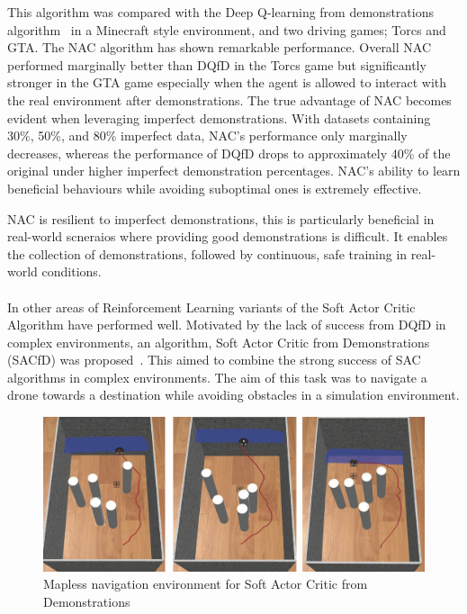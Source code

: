 This algorithm was compared with the Deep Q-learning from demonstrations algorithm~\cite{deepQLearningFromDemo} in a Minecraft style environment, and two driving games; Torcs and GTA.
The NAC algorithm has shown remarkable performance.
Overall NAC performed marginally better than DQfD in the Torcs game but significantly stronger in the GTA game especially when the agent is allowed to interact with the real environment after demonstrations.
The true advantage of NAC becomes evident when leveraging imperfect demonstrations.
With datasets containing 30\%, 50\%, and 80\% imperfect data, NAC's performance only marginally decreases, whereas the performance of DQfD drops to approximately 40\% of the original under higher imperfect demonstration percentages.
NAC's ability to learn beneficial behaviours while avoiding suboptimal ones is extremely effective.

NAC is resilient to imperfect demonstrations, this is particularly beneficial in real-world scneraios where providing good demonstrations is difficult.
It enables the collection of demonstrations, followed by continuous, safe training in real-world conditions. \\\\



In other areas of Reinforcement Learning variants of the Soft Actor Critic Algorithm have performed well.
Motivated by the lack of success from DQfD in complex environments, an algorithm, Soft Actor Critic from Demonstrations (SACfD) was proposed~\cite{SACfDMaplessNavigation}.
This aimed to combine the strong success of SAC algorithms in complex environments.
The aim of this task was to navigate a drone towards a destination while avoiding obstacles in a simulation environment.

\begin{figure}[htbp]
  \centering
  \includegraphics[width=\textwidth]{background/fyp17-sacfd.png}
  \caption{Mapless navigation environment for Soft Actor Critic from Demonstrations}
\label{fig:fyp17-sacfd}
\end{figure}

